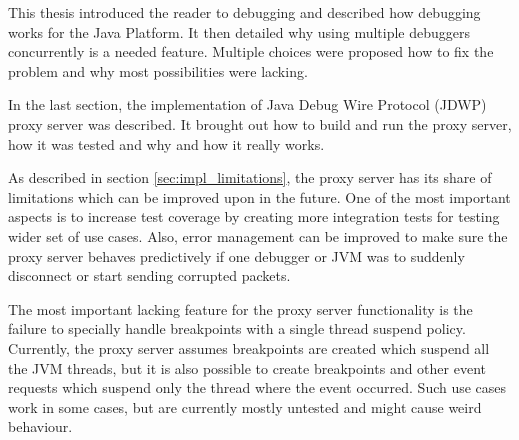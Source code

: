 \documentclass[..thesis.tex]{subfiles}
\begin{document}
This thesis introduced the reader to debugging and described how debugging works for the Java Platform.
It then detailed why using multiple debuggers concurrently is a needed feature.
Multiple choices were proposed how to fix the problem and why most possibilities were lacking.

In the last section, the implementation of Java Debug Wire Protocol (JDWP) proxy server was described.
It brought out how to build and run the proxy server, how it was tested and why and how it really works.

As described in section \ref{sec:impl_limitations}, the proxy server has its share of limitations which can be improved upon in the future.
One of the most important aspects is to increase test coverage by creating more integration tests for testing wider set of use cases.
Also, error management can be improved to make sure the proxy server behaves predictively if one debugger or JVM was to suddenly disconnect or start sending corrupted packets.

The most important lacking feature for the proxy server functionality is the failure to specially handle breakpoints with a single thread suspend policy. 
Currently, the proxy server assumes breakpoints are created which suspend all the JVM threads, but it is also possible to create breakpoints and other event requests which suspend only the thread where the event occurred.
Such use cases work in some cases, but are currently mostly untested and might cause weird behaviour.
\end{document}
